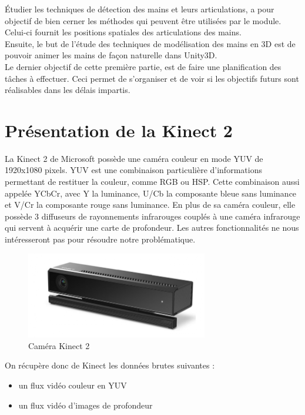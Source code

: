 Étudier les techniques de détection des mains et leurs articulations, 
a pour objectif de bien cerner les méthodes qui peuvent être utilisées 
par le module. Celui-ci fournit les positions spatiales des 
articulations des mains.\\

Ensuite, le but de l'étude des techniques de modélisation des mains en 
3D est de pouvoir animer les mains de façon naturelle dans Unity3D.\\

Le dernier objectif de cette première partie, est de faire une 
planification des tâches à effectuer. Ceci permet de s'organiser et 
de voir si les objectifs futurs sont réalisables dans les délais 
impartis.\\  


\section{Présentation de la Kinect 2}
La Kinect 2 de Microsoft possède une caméra couleur en mode YUV de 1920x1080 pixels.
YUV est une combinaison particulière d'informations permettant de restituer la couleur, comme RGB ou HSP.
Cette combinaison aussi appelée YCbCr, avec Y la luminance, U/Cb la composante bleue sans luminance et V/Cr la composante rouge sans luminance.
En plus de sa caméra couleur, elle possède 3 diffuseurs de rayonnements infrarouges couplés à une caméra infrarouge qui servent à acquérir une carte de profondeur.
Les autres fonctionnalités ne nous intéresseront pas pour résoudre notre problématique.\\

\begin{figure}[H]
 \center
 \includegraphics[width=300px]{images/kinect-v2.png}
 \caption{Caméra Kinect 2}
\end{figure}

On récupère donc de Kinect les données brutes suivantes : 
\begin{itemize}
 \item un flux vidéo couleur en YUV
 \item un flux vidéo d'images de profondeur
\end{itemize}

